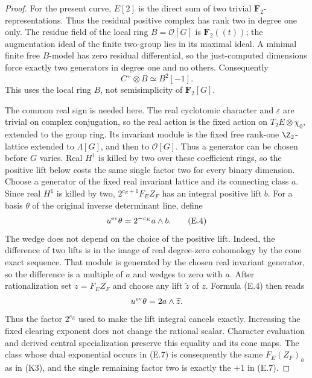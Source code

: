 \begin{proof}
For the present curve, $E[2]$ is the direct sum of two trivial
$\mathbf F_2$-representations. Thus the residual positive complex has
rank two in degree one only. The residue field of the local ring
$B=\mathscr O[G]$ is $\mathbf F_2((t))$; the augmentation ideal of
the finite two-group lies in its maximal ideal. A minimal finite free
$B$-model has zero residual differential, so the just-computed dimensions
force exactly two generators in degree one and no others. Consequently
\[
                    C^+\otimes B\simeq B^2[-1].\tag{E.3}
\]
This uses the local ring $B$, not semisimplicity of $\mathbf F_2[G]$.

The common real sign is needed here. The real cyclotomic character
and $\varepsilon$ are trivial on complex conjugation, so the real
action is the fixed action on $T_2E\otimes\chi_0$, extended to the
group ring. Its invariant module is the fixed free rank-one
$\Z_2$-lattice extended to $\Lambda[G]$, and then to
$\mathscr O[G]$. Thus a generator can be chosen before $G$ varies.
Real $H^1$ is killed by two over these coefficient rings, so the
positive lift below costs the same single factor two for every
binary dimension.
Choose a generator of the fixed real invariant lattice and its
connecting class $a$. Since real $H^1$ is killed by two,
$2^{c_E+1}F_EZ_F$ has an integral positive lift $b$.
For a basis $\theta$ of the original inverse determinant line, define
\[
                         u^{\rm ev}\theta=2^{-c_E}a\wedge b.
 \tag{E.4}
\]
The wedge does not depend on the choice of the positive lift.
Indeed, the difference of two lifts is in the image of real
degree-zero cohomology by the cone exact sequence. That module
is generated by the chosen real invariant generator, so the
difference is a multiple of $a$ and wedges to zero with $a$.
After rationalization set $z=F_EZ_F$ and choose any lift
$\widetilde z$ of $z$. Formula (E.4) then reads
\[
              u^{\rm ev}\theta=2a\wedge\widetilde z.
\]
Thus the factor $2^{c_E}$ used to make the lift integral cancels
exactly. Increasing the fixed clearing exponent does not change
the rational scalar. Character evaluation and derived central
specialization preserve this equality and its cone maps. The
class whose dual exponential occurs in (E.7) is consequently
the same $F_E(Z_F)_h$ as in (K3), and the single remaining factor
two is exactly the $+1$ in (E.7).


\end{proof}
